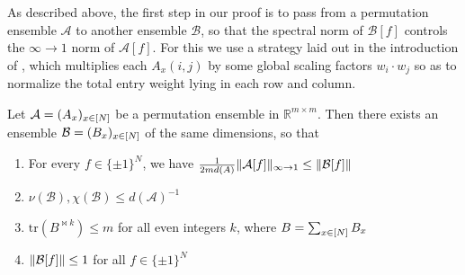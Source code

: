As described above, the first step in our proof is to pass from a permutation ensemble $\mathcal{A}$ to another ensemble $\mathcal{B}$, so that the spectral norm of $\mathcal{B}[f]$ controls the $\infty\to 1$ norm of $\mathcal{A}[f]$. For this we use a strategy laid out in the introduction of \cite{simpler-moore}, which multiplies each $A_x(i,j)$ by some global scaling factors $w_i \cdot w_j$ so as to normalize the total entry weight lying in each row and column. 
\begin{lemma}\label{cellprobe:lem:infty-to-spectral}
Let $\mathcal{A}=(A_x)_{x \in [N]}$ be a permutation ensemble in $\mathbb{R}^{m \times m}$. Then there exists an ensemble $\mathcal{B}=(B_x)_{x \in [N]}$ of the same dimensions, so that
\begin{enumerate}
	\item For every $f \in \{\pm 1\}^N$, we have $\frac{1}{2md(A)}\Vert \mathcal{A}[f] \Vert_{\infty \to 1} \leq \Vert \mathcal{B}[f] \Vert $
	\item $\nu(\mathcal{B}),\chi(\mathcal{B}) \leq d(\mathcal{A})^{-1}$
	\item $\mathrm{tr}(B^{\bowtie k}) \leq m$ for all even integers $k$, where $B = \sum_{x \in [N]} B_x$
	\item $\Vert \mathcal{B}[f] \Vert \leq 1$ for all $f\in \{\pm 1\}^N$
\end{enumerate}
\end{lemma}
